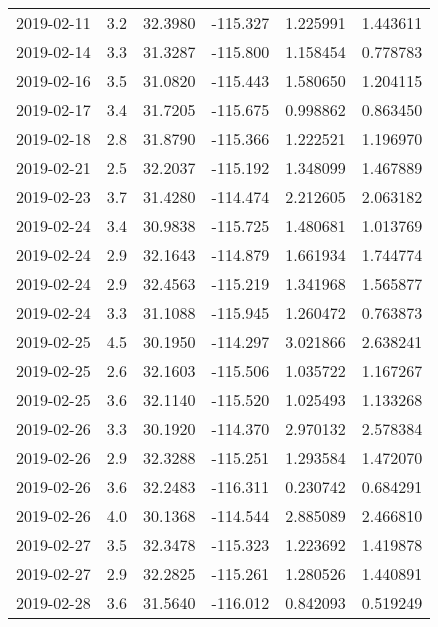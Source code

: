 \begin{tabular}{lrrrrr}
2019-02-11 &       3.2 &  32.3980 &  -115.327 &         1.225991 &         1.443611 \\
2019-02-14 &       3.3 &  31.3287 &  -115.800 &         1.158454 &         0.778783 \\
2019-02-16 &       3.5 &  31.0820 &  -115.443 &         1.580650 &         1.204115 \\
2019-02-17 &       3.4 &  31.7205 &  -115.675 &         0.998862 &         0.863450 \\
2019-02-18 &       2.8 &  31.8790 &  -115.366 &         1.222521 &         1.196970 \\
2019-02-21 &       2.5 &  32.2037 &  -115.192 &         1.348099 &         1.467889 \\
2019-02-23 &       3.7 &  31.4280 &  -114.474 &         2.212605 &         2.063182 \\
2019-02-24 &       3.4 &  30.9838 &  -115.725 &         1.480681 &         1.013769 \\
2019-02-24 &       2.9 &  32.1643 &  -114.879 &         1.661934 &         1.744774 \\
2019-02-24 &       2.9 &  32.4563 &  -115.219 &         1.341968 &         1.565877 \\
2019-02-24 &       3.3 &  31.1088 &  -115.945 &         1.260472 &         0.763873 \\
2019-02-25 &       4.5 &  30.1950 &  -114.297 &         3.021866 &         2.638241 \\
2019-02-25 &       2.6 &  32.1603 &  -115.506 &         1.035722 &         1.167267 \\
2019-02-25 &       3.6 &  32.1140 &  -115.520 &         1.025493 &         1.133268 \\
2019-02-26 &       3.3 &  30.1920 &  -114.370 &         2.970132 &         2.578384 \\
2019-02-26 &       2.9 &  32.3288 &  -115.251 &         1.293584 &         1.472070 \\
2019-02-26 &       3.6 &  32.2483 &  -116.311 &         0.230742 &         0.684291 \\
2019-02-26 &       4.0 &  30.1368 &  -114.544 &         2.885089 &         2.466810 \\
2019-02-27 &       3.5 &  32.3478 &  -115.323 &         1.223692 &         1.419878 \\
2019-02-27 &       2.9 &  32.2825 &  -115.261 &         1.280526 &         1.440891 \\
2019-02-28 &       3.6 &  31.5640 &  -116.012 &         0.842093 &         0.519249 \\

\end{tabular}
